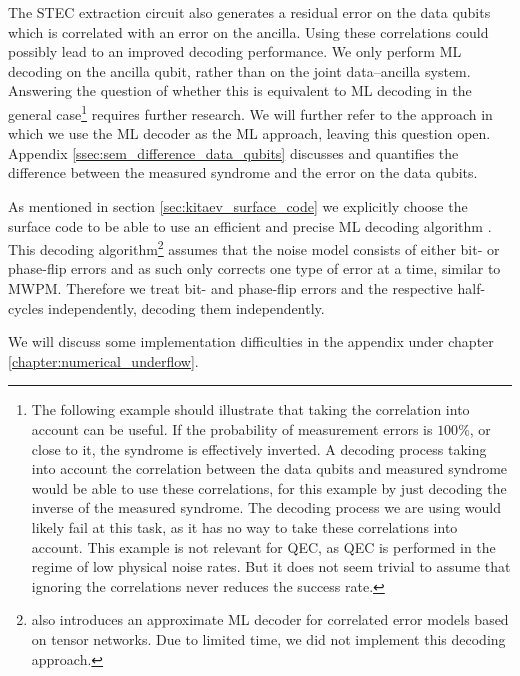 The STEC extraction circuit also generates a residual error on the data qubits which is correlated with an error on the ancilla.
Using these correlations could possibly lead to an improved decoding performance.
We only perform ML decoding on the ancilla qubit, rather than on the joint data--ancilla system.
Answering the question of whether this is equivalent to ML decoding in the general case\footnote{
    The following example should illustrate that taking the correlation into account can be useful.
    If the probability of measurement errors is $100\%$, or close to it, the syndrome is effectively inverted.
    A decoding process taking into account the correlation between the data qubits and measured syndrome would be able to use these correlations, 
    for this example by just decoding the inverse of the measured syndrome. 
    The decoding process we are using would likely fail at this task, as it has no way to take these correlations into account.
    This example is not relevant for QEC, as QEC is performed in the regime of low physical noise rates. 
    But it does not seem trivial to assume that ignoring the correlations never reduces the success rate.
} requires further research. 
We will further refer to the approach in which we use the ML decoder as the ML approach, leaving this question open.
Appendix \ref{ssec:sem_difference_data_qubits} discusses and quantifies the difference between the measured syndrome and the error on the data qubits. 

As mentioned in section \ref{sec:kitaev_surface_code} we explicitly choose the surface code to be able to use an efficient and precise ML decoding algorithm \cite{efficient_decoding_algorithm}.
This decoding algorithm\footnote{
    \cite{efficient_decoding_algorithm} also introduces an approximate ML decoder for correlated error models based on tensor networks.
    Due to limited time, we did not implement this decoding approach.
} assumes that the noise model consists of either bit- or phase-flip errors and as such only corrects one type of error at a time, similar to MWPM.
Therefore we treat bit- and phase-flip errors and the respective half-cycles independently, decoding them independently. 

We will discuss some implementation difficulties in the appendix under chapter \ref{chapter:numerical_underflow}.


